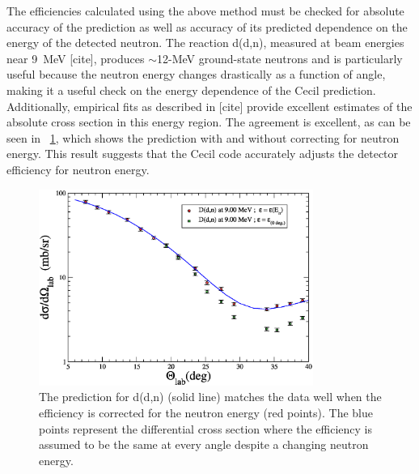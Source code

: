 The efficiencies calculated using the above method must be checked for absolute accuracy of the prediction as well as accuracy of its predicted dependence on the energy of the detected neutron.  The reaction d(d,n), measured at beam energies near 9~MeV [cite], produces $\sim$12-MeV ground-state neutrons and is particularly useful because the neutron energy changes drastically as a function of angle, making it a useful check on the energy dependence of the Cecil prediction.  Additionally, empirical fits as described in [cite] provide excellent estimates of the absolute cross section in this energy region.  The agreement is excellent, as can be seen in {\fig}~\ref{fig:DeuteriumMatch}, which shows the prediction with and without correcting for neutron energy.  This result suggests that the Cecil code accurately adjusts the detector efficiency for neutron energy.  
\begin{figure}[!htbp]
\centering
\includegraphics[width=0.8\textwidth]{figures/deuteriumMatch.eps}
\caption{The prediction for d(d,n) (solid line) matches the data well when the efficiency is corrected for the neutron energy (red points).  The blue points represent the differential cross section where the efficiency is assumed to be the same at every angle despite a changing neutron energy.}
\label{fig:DeuteriumMatch}
\end{figure}

